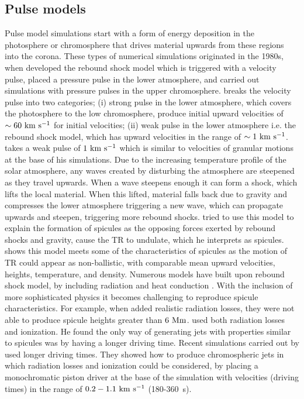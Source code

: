 \subsection{Pulse models}
\label{ssec:pulse_model}
Pulse model simulations start with a form of energy deposition in the photosphere or chromosphere that drives material upwards from these regions into the corona. These types of numerical simulations originated in the 1980s, when \cite{Hollweg1982ApJ257345H} developed the rebound shock model which is triggered with a velocity pulse, \cite{Suematsu1982SoPh7599S} placed a pressure pulse in the lower atmosphere, and  \cite{Shibata1982} carried out simulations with pressure pulses in the upper chromosphere. \cite{Sterling_2000SoPh} breaks the velocity pulse into two categories; (i) strong pulse in the lower atmosphere, which covers the photosphere to the low chromosphere, produce initial upward velocities of $\sim 60~\rm{km ~s^{-1}}$ for initial velocities; (ii) weak pulse in the lower atmosphere i.e. the rebound shock model, which has upward velocities in the range of $\sim 1 ~\rm{km ~s^{-1}}$. \np
%
\cite{Hollweg1982ApJ257345H} takes a weak pulse of $1~\rm{km ~s^{-1}}$ which is similar to velocities of granular motions at the base of his simulations. Due to the increasing temperature profile of the solar atmosphere, any waves created by disturbing the atmosphere are steepened as they travel upwards. When a wave steepens enough it can form a shock, which lifts the local material. When this lifted, material falls back due to gravity and compresses the lower atmosphere triggering a new wave, which can propagate upwards and steepen, triggering more rebound shocks. \cite{Hollweg1982ApJ257345H} tried to use this model to explain the formation of spicules as the opposing forces exerted by rebound shocks and gravity, cause the TR to undulate, which he interprets as spicules. \cite{Hollweg1982ApJ257345H} shows this model meets some of the characteristics of spicules as the motion of TR could appear as non-ballistic, with comparable mean upward velocities, heights, temperature, and density. Numerous models have built upon rebound shock model, by including radiation and heat conduction \citep{Sterling1988ApJ327950S, Sterling1990ApJ349647S, Cheng1992AA266549C, Cheng1992AA262581C, Cheng1992AA266537C}. With the inclusion of more sophisticated physics it becomes challenging to reproduce spicule characteristics. For example, when \cite{Sterling1990ApJ349647S} added realistic radiation losses, they were not able to produce spicule heights greater than $6~\rm{Mm}$. \cite{Cheng1992AA266549C, Cheng1992AA266537C} used both radiation losses and ionization. He found the only way of generating jets with properties similar to spicules was by having a longer driving time. Recent simulations carried out by \cite{Heggland2007ApJ6661277H} used longer driving times. They showed how to produce chromospheric jets in which radiation losses and ionization could be considered, by placing a monochromatic piston driver at the base of the simulation with velocities (driving times) in the range of $0.2-1.1~\rm{km ~s^{-1}}$ (180-360~\rm{s}). \np
